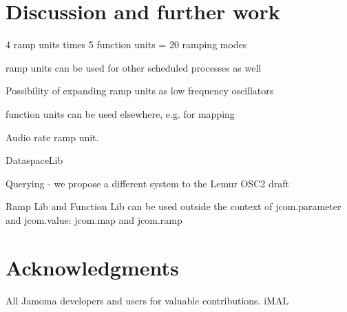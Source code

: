\documentclass{sig-alternate}
\begin{document}

\section{Discussion and further work} %
\label{sec:discussion_and_further_work}

4 ramp units times 5 function units = 20 ramping modes

ramp units can be used for other scheduled processes as well

Possibility of expanding ramp units as low frequency oscillators

function units can be used elsewhere, e.g. for mapping

Audio rate ramp unit.

DataspaceLib

Querying - we propose a different system to the Lemur OSC2 draft

Ramp Lib and Function Lib can be used outside the context of jcom.parameter and jcom.value: jcom.map and jcom.ramp











\section{Acknowledgments} %
\label{sec:acknowledgments}

All Jamoma developers and users for valuable contributions. 
iMAL





%

%


\balancecolumns %
\end{document}
